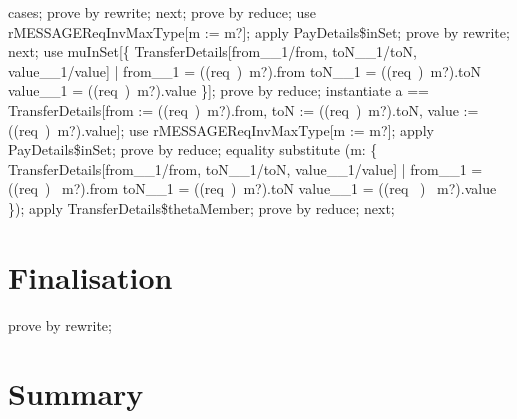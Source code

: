 \begin{LDCheck}\begin{zproof}
    cases;
    prove by rewrite;
    next;
    prove by reduce;
    use rMESSAGEReqInvMaxType[m := m?];
    apply PayDetails\$inSet;
    prove by rewrite;
    next;
    use muInSet[\{ TransferDetails[from\_\_1/from, toN\_\_1/toN, value\_\_1/value]
        | from\_\_1 = ((req~\inv)~m?).from \land toN\_\_1 = ((req~\inv)~m?).toN
          \land value\_\_1 = ((req~\inv)~m?).value \}];
    prove by reduce;
    instantiate a == \theta TransferDetails[from := ((req~\inv)~m?).from,
        toN := ((req~\inv)~m?).toN, value := ((req~\inv)~m?).value];
    use rMESSAGEReqInvMaxType[m := m?];
    apply PayDetails\$inSet;
    prove by reduce;
    equality substitute
      (\mu m: \{ TransferDetails[from\_\_1/from, toN\_\_1/toN, value\_\_1/value]
         | from\_\_1 = ((req~\inv)~ m?).from \land toN\_\_1 = ((req~\inv)~m?).toN
           \land value\_\_1 = ((req~ \inv)~ m?).value \});
    apply TransferDetails\$thetaMember;
    prove by reduce;
    next;
\end{zproof}\end{LDCheck}

\section{Finalisation}

\begin{LDCheck}\begin{zproof}
   prove by rewrite;
\end{zproof}\end{LDCheck}

\newpage
\section{Summary}\label{ch6.ps.summary}
\lpscriptsummary
